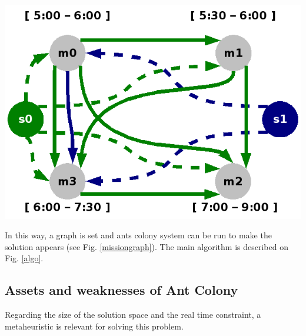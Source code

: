 \documentclass[a4paper,10pt]{article}
\makeatletter
\newenvironment{figurehere}
{\def\@captype{figure}}
{}
\makeatother
\begin{document}
\begin{multicols}{2}
\begin{figurehere}
	\begin{center}
	\includegraphics[width=\textwidth]{Shemas/missionGraphComplet.png}
	\label{missiongraph}	
	\end{center}	
\end{figurehere}

In this way, a graph is set and ants colony system can be run to make the solution appears (see Fig. \ref{missiongraph}). The main algorithm is described on Fig. \ref{algo}. \\

\begin{figurehere}
	\label{algo}
\end{figurehere}


\subsection{Assets and weaknesses of Ant Colony}
Regarding the size of the solution space and the real time constraint, a metaheuristic is relevant for solving this problem. \\


\end{multicols}
\end{document}
